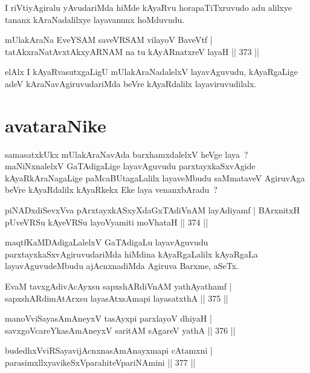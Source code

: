 \begin{artha}
I riVtiyAgiralu yAvudariMda hiMde kAyaRvu horapaTiTxruvudo adu alilxye tananx kAraNadalilxye layavanunx hoMduvudu.
\end{artha}

\begin{shl}
mUlakAraNa EveYSAM saveVRSAM vilayoV BaveVtf |
tatAkxraNatAvxtAkxyARNAM na tu kAyARnatxreV layaH \hfill || 373 ||
\end{shl}

\begin{artha}
elAlx I kAyaRvasutxgaLigU mUlakAraNadalelxV layavAguvudu, kAyaRgaLige adeV kAraNavAgiruvudariMda beVre kAyaRdalilx layaviruvudilalx.
\end{artha}

\section*{avataraNike}

\begin{artha}
samasatxkUkx mUlakAraNavAda barxhamxdalelxV heVge laya~? maNiNxnalelxV GaTAdigaLige layavAguvudu parxtayxkaSxvAgide kAyaRkAraNagaLige paMcaBUtagaLalilx layaveMbudu saMmataveV AgiruvAga beVre kAyaRdalilx kAyaRkekx Eke laya venanxbAradu~?
\end{artha}

\begin{shl}
piNADxdiSevxVva pArxtayxkASxyXdaGxTAdiVnAM layAdiyamf |
BArxnitxH pUveVRSu kAyeVRSu layoV\s yamiti moVhataH \hfill || 374 ||
\end{shl}

\begin{artha}
maqtfKaMDAdigaLalelxV GaTAdigaLu layavAguvudu parxtayxkaSxvAgiruvudariMda hiMdina kAyaRgaLalilx kAyaRgaLa layavAguvudeMbudu ajAcnxnadiMda Agiruva Barxme, aSeTx.
\end{artha}

\begin{shl}
EvaM tavxgAdivAcAyxsu sapxshARdiVnAM yathAyathamf |
sapxshARdimAtArxsu layasAtxsAmapi layasatxthA \hfill || 375 ||
\end{shl}
\begin{shl}
manoVviSayasAmAneyxV tasAyxpi parxlayoV dhiyaH |
savxgoVcareYkasAmAneyxV saritAM sAgareV yathA \hfill || 376 ||
\end{shl}
\begin{shl}
budedhxVviRSayavijAcnxnasAmAnayxmapi cA\s \s tamxni |
parasimxllxyavikeSxVparahiteV\s pariNAmini \hfill || 377 ||
\end{shl}

